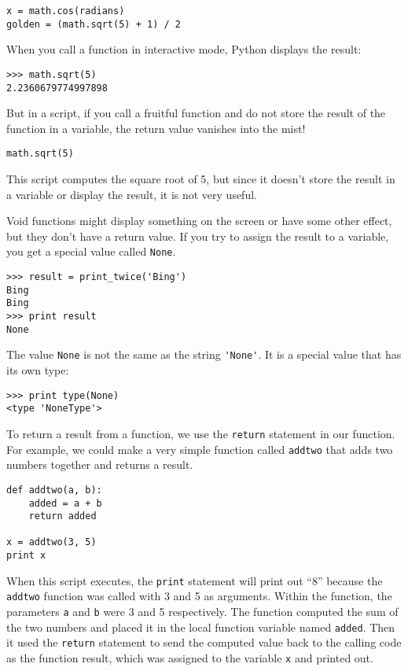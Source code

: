 \beforeverb
\begin{verbatim}
x = math.cos(radians)
golden = (math.sqrt(5) + 1) / 2
\end{verbatim}
\afterverb
%
When you call a function in interactive mode, Python displays
the result:

\beforeverb
\begin{verbatim}
>>> math.sqrt(5)
2.2360679774997898
\end{verbatim}
\afterverb
%
But in a script, if you call a fruitful function and do 
not store the result of the function in a variable,
the return value vanishes into the mist!

\beforeverb
\begin{verbatim}
math.sqrt(5)
\end{verbatim}
\afterverb
%
This script computes the square root of 5, but since it doesn't store
the result in a variable or display the result, it is not very useful.


Void functions might display something on the screen or have some
other effect, but they don't have a return value.  If you try to
assign the result to a variable, you get a special value called
{\tt None}.


\beforeverb
\begin{verbatim}
>>> result = print_twice('Bing')
Bing
Bing
>>> print result
None
\end{verbatim}
\afterverb
%
The value {\tt None} is not the same as the string \verb"'None'". 
It is a special value that has its own type:

\beforeverb
\begin{verbatim}
>>> print type(None)
<type 'NoneType'>
\end{verbatim}
\afterverb
%
To return a result from a function, we use the {\tt return} statement 
in our function.  For example, we could make a very 
simple function called {\tt addtwo}
that adds two numbers together and returns a result.

\beforeverb
\begin{verbatim}
def addtwo(a, b):
    added = a + b
    return added

x = addtwo(3, 5)
print x
\end{verbatim}
\afterverb
%
When this script executes, the {\tt print} statement will print out ``8''
because the {\tt addtwo} function was called with 3 and 5 as arguments.
Within the function, the parameters {\tt a} and {\tt b} were 3 and 5 
respectively. The function computed the sum of the two numbers and placed
it in the local function variable named {\tt added}. 
Then it used the {\tt return} statement 
to send the computed value back to the calling code 
as the function result, which was assigned
to the variable {\tt x} and printed out.



